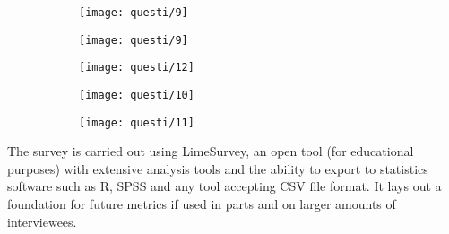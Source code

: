 \begin{figure}[h!]
\begin{subfigure}[b]{0.29\linewidth}
	\texttt{[image: questi/9]}
\end{subfigure}



\begin{subfigure}[b]{\linewidth}
	\texttt{[image: questi/9]}
\end{subfigure}




\begin{subfigure}[b]{\linewidth}
	\texttt{[image: questi/12]}
\end{subfigure}


\begin{subfigure}[b]{\linewidth}
	\texttt{[image: questi/10]}
\end{subfigure}



\begin{subfigure}[b]{\linewidth}
	\texttt{[image: questi/11]}
\end{subfigure}


\end{figure}



\clearpage

The survey is carried out using LimeSurvey, an open tool (for educational purposes) with extensive analysis tools and the ability to export to statistics software such as R, SPSS and any tool accepting CSV file format. It lays out a foundation for future metrics if used in parts and on larger amounts of interviewees.

